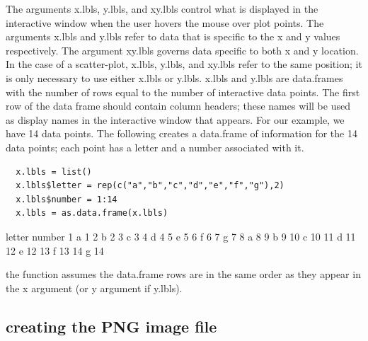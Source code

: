 \documentclass[]{article}
\begin{document}
\indent The arguments x.lbls, y.lbls, and xy.lbls control what is displayed in the interactive window when the user hovers the mouse over plot points. The arguments x.lbls and y.lbls refer to data that is specific to the x and y values respectively. The argument xy.lbls governs data specific to both x and y location. In the case of a scatter-plot, x.lbls, y.lbls, and xy.lbls refer to the same position; it is only necessary to use either x.lbls or y.lbls. x.lbls and y.lbls are data.frames with the number of rows equal to the number of interactive data points. The first row of the data frame should contain column headers; these names will be used as display names in the interactive window that appears. \newline
\indent For our example, we have 14 data points. The following creates a data.frame of information for the 14 data points; each point has a letter and a number associated with it. 
\begin{verbatim}
  x.lbls = list()
  x.lbls$letter = rep(c("a","b","c","d","e","f","g"),2)
  x.lbls$number = 1:14
  x.lbls = as.data.frame(x.lbls)
\end{verbatim}
\begin{Schunk}
\begin{Soutput}
   letter number
1       a      1
2       b      2
3       c      3
4       d      4
5       e      5
6       f      6
7       g      7
8       a      8
9       b      9
10      c     10
11      d     11
12      e     12
13      f     13
14      g     14
\end{Soutput}
\end{Schunk}
 the function assumes the data.frame rows are in the same order as they appear in the x argument (or y argument if y.lbls).  \newline


\subsection{creating the PNG image file}
\end{document}
